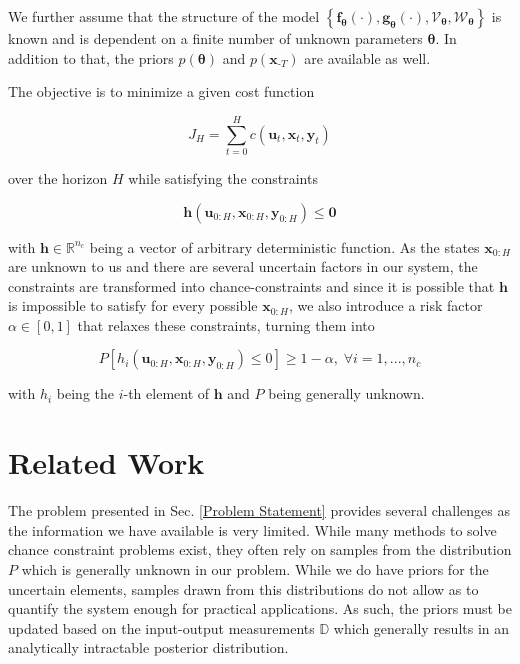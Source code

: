 We further assume that the structure of the model $\left\{\boldsymbol{f}_{\boldsymbol{\theta}}(\cdot), \boldsymbol{g}_{\boldsymbol{\theta}}(\cdot), \boldsymbol{\mathcal{V}}_{\boldsymbol{\theta}}, \boldsymbol{\mathcal{W}}_{\boldsymbol{\theta}}\right\}$ is known and is dependent on a finite number of unknown parameters $\boldsymbol{\theta}$. In addition to that, the priors $p(\boldsymbol{\theta})$ and $p(\boldsymbol{x}_{\text{-}T})$ are available as well.

The objective is to minimize a given cost function 

\begin{equation} \label{cost function}
J_H = \sum_{t = 0}^H c(\boldsymbol{u}_t,  \boldsymbol{x}_t,  \boldsymbol{y}_t)
\end{equation}

over the horizon $H$ while satisfying the constraints 

\begin{equation} \label{constraints}
\boldsymbol{h}(\boldsymbol{u}_{0:H},  \boldsymbol{x}_{0:H},  \boldsymbol{y}_{0:H}) \leq \boldsymbol{0}
\end{equation}

with $\boldsymbol{h} \in \mathbb{R}^{n_c}$ being a vector of arbitrary deterministic function. As the states $\boldsymbol{x}_{0:H}$ are unknown to us and there are several uncertain factors in our system, the constraints are transformed into chance-constraints and since it is possible that $\boldsymbol{h}$ is impossible to satisfy for every possible $\boldsymbol{x}_{0:H}$, we also introduce a risk factor $\alpha \in [0, 1]$ that relaxes these constraints, turning them into

\begin{equation} \label{risk constraints}
P \left[ h_i(\boldsymbol{u}_{0:H},  \boldsymbol{x}_{0:H},  \boldsymbol{y}_{0:H}) \leq 0 \right] \geq 1 - \alpha, \; \forall i = 1,...,n_c
\end{equation}

with $h_i$ being the $i$-th element of $\boldsymbol{h}$ and $P$ being generally unknown.

\section{Related Work}


The problem presented in Sec. \ref{Problem Statement} provides several challenges as the information we have available is very limited. While many methods to solve chance constraint problems exist, they often rely on samples from the distribution $P$ which is generally unknown in our problem. While we do have priors for the uncertain elements, samples drawn from this distributions do not allow as to quantify the system enough for practical applications. As such, the priors must be updated based on the input-output measurements $\mathbb{D}$ which generally results in an analytically intractable posterior distribution.

